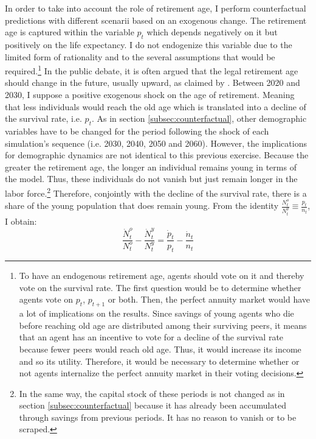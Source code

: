 In order to take into account the role of retirement age, I perform counterfactual predictions with different scenarii based on an exogenous change. The retirement age is captured within the variable $p_t$ which depends negatively on it but positively on the life expectancy. I do not endogenize this variable due to the limited form of rationality and to the several assumptions that would be required.\footnote{To have an endogenous retirement age, agents should vote on it and thereby vote on the survival rate. The first question would be to determine whether agents vote on $p_t$, $p_{t+1}$ or both. Then, the perfect annuity market would have a lot of implications on the results. Since savings of young agents who die before reaching old age are distributed among their surviving peers, it means that an agent has an incentive to vote for a decline of the survival rate because fewer peers would reach old age. Thus, it would increase its income and so its utility. Therefore, it would be necessary to determine whether or not agents internalize the perfect annuity market in their voting decisions.} In the public debate, it is often argued that the legal retirement age should change in the future, usually upward, as claimed by \cite{Gonzalez-Eiras2012}%
. Between 2020 and 2030, I suppose a positive exogenous shock on the age of retirement. Meaning that less individuals would reach the old age which is translated into a decline of the survival rate, i.e. $p_t$. As in section \ref{subsec:counterfactual}, other demographic variables have to be changed for the period following the shock of each simulation's sequence (i.e. 2030, 2040, 2050 and 2060). However, the implications for demographic dynamics are not identical to this previous exercise. Because the greater the retirement age, the longer an individual remains young in terms of the model. Thus, these individuals do not vanish but just remain longer in the labor force.\footnote{In the same way, the capital stock of these periods is not changed as in section \ref{subsec:counterfactual} because it has already been accumulated through savings from previous periods. It has no reason to vanish or to be scraped.}
Therefore, conjointly with the decline of the survival rate, there is a share of the young population that does remain young.
From the identity $\frac{N_t^o}{N_t^y} \equiv \frac{p_t}{n_t}$, I obtain:
\begin{equation} \label{eq:demo_growth_identity}
	\frac{\dot{N}_t^o}{N_t^o} - \frac{\dot{N}_t^y}{N_t^y} = \frac{\dot{p}_t}{p_t} - \frac{\dot{n}_t}{n_t}
\end{equation}
